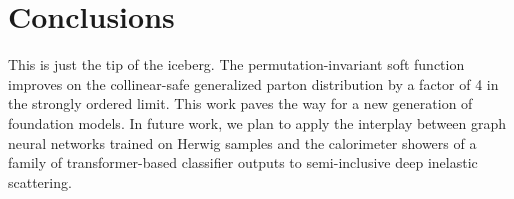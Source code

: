 \section{Conclusions}\label{sec:conclusions}

This is just the tip of the iceberg. The permutation-invariant soft
function improves on the collinear-safe generalized parton distribution
by a factor of 4 in the strongly ordered limit. This work paves the way
for a new generation of foundation models. In future work, we plan to
apply the interplay between graph neural networks trained on Herwig
samples and the calorimeter showers of a family of transformer-based
classifier outputs to semi-inclusive deep inelastic scattering.

